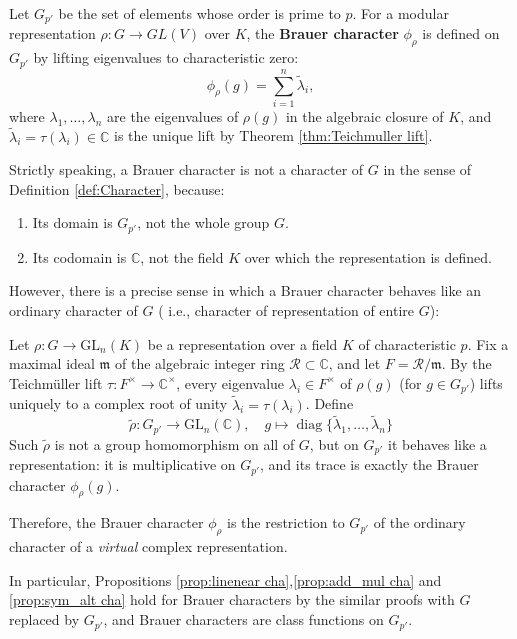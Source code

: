 \begin{defn}
Let \(G_{p'}\) be the set of elements whose order is prime to \(p\). For a modular representation \(\rho: G \to GL(V)\) over \(K\), the \textbf{Brauer character} \(\phi_\rho\) is defined on \(G_{p'}\) by lifting eigenvalues to characteristic zero:
\[
\phi_\rho(g) = \sum_{i=1}^n \tilde{\lambda}_i,
\]
where \(\lambda_1, \ldots, \lambda_n\) are the eigenvalues of \(\rho(g)\) in the algebraic closure of \(K\), and \(\tilde{\lambda}_i = \tau(\lambda_i)\in \mathbb{C}\) is the unique lift  by Theorem \ref{thm:Teichmuller lift}.
\end{defn}
\begin{remark}
Strictly speaking, a Brauer character is not a character of $G$ in the sense of Definition \ref{def:Character}, because:
\begin{enumerate}
    \item Its domain is \(G_{p'}\), not the whole group \(G\).
    \item Its codomain is \(\mathbb{C}\), not the field \(K\) over which the representation is defined.
\end{enumerate}
However, there is a precise sense in which a Brauer character behaves like an ordinary character of $G$ ( i.e., character of representation of entire $G$):

Let \(\rho: G \to \mathrm{GL}_n(K)\) be a representation over a field \(K\) of characteristic \(p\). Fix a maximal ideal \(\mathfrak{m}\) of the algebraic integer ring \(\mathcal{R} \subset \mathbb{C}\), and let \(F = \mathcal{R}/\mathfrak{m}\). By the Teichm\"uller lift \(\tau: F^\times \to \mathbb{C}^\times\), every eigenvalue \(\lambda_i \in F^\times\) of \(\rho(g)\) (for \(g \in G_{p'}\)) lifts uniquely to a complex root of unity \(\tilde{\lambda}_i = \tau(\lambda_i)\). Define\[\tilde{\rho}: G_{p'} \to \mathrm{GL}_n(\mathbb{C}),\quad g\mapsto \operatorname{diag}\{\tilde{\lambda}_1, \dots, \tilde{\lambda}_n\}\]
Such \(\tilde{\rho}\) is not a group homomorphism on all of \(G\), but on \(G_{p'}\) it behaves like a representation: it is multiplicative on \(G_{p'}\), and its trace is exactly the Brauer character \(\phi_\rho(g)\).

Therefore, the Brauer character \(\phi_\rho\) is the restriction to \(G_{p'}\) of the ordinary character of a \emph{virtual} complex representation. 

In particular, Propositions \ref{prop:linenear cha},\ref{prop:add_mul cha} and \ref{prop:sym_alt cha} hold for Brauer characters by the similar proofs with \(G\) replaced by \(G_{p'}\), and Brauer characters are class functions on \(G_{p'}\).
\end{remark}

